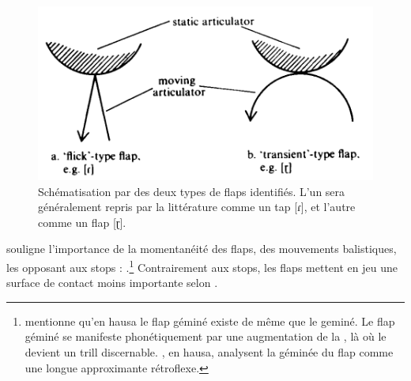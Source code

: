 \begin{figure}
	\centering
	\includegraphics[width=0.9\linewidth]{rhotiques/images/figure_29_catford}
	\caption[Schématisation des . Figure issue de Catford (1977)]{Schématisation par \textcite[129]{catfordFundamentalProblemsPhonetics1977} des deux types de flaps identifiés. L'un sera généralement repris par la littérature comme un tap [ɾ], et l'autre comme un flap [ɽ].}
	\label{fig:figure29catford}
\end{figure}

\textcite[129]{catfordFundamentalProblemsPhonetics1977} souligne l'importance de la momentanéité des flaps, des mouvements balistiques, les opposant aux stops : .\footnote{\textcite[397]{newmanHausaLanguageEncyclopedic2000} mentionne qu'en hausa le flap géminé existe de même que le  geminé. Le flap géminé se manifeste phonétiquement par une augmentation de la , là où le  devient un trill discernable. \textcite[237]{ladefogedSoundsWorldLanguages1996}, en hausa, analysent la géminée du flap comme une longue approximante rétroflexe.} Contrairement aux stops, les flaps mettent en jeu une surface de contact moins importante selon \textcite[251]{catfordFundamentalProblemsPhonetics1977}.\\


